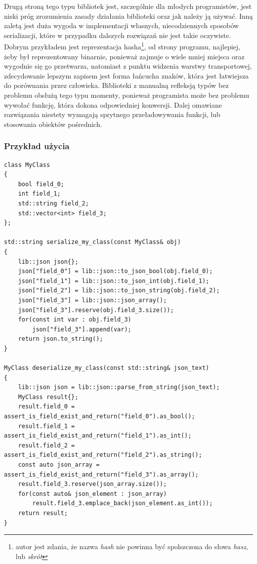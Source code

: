 \documentclass[12pt]{article}
\begin{document}
{{{				Drugą stroną tego typu bibliotek jest, szczególnie dla młodych programistów, jest niski próg zrozumienia zasady działania
				biblioteki oraz jak należy ją używać. Inną zaletą jest duża wygoda w implementacji własnych, niecodziennych sposobów serializacji,
				które w przypadku dalszych rozwiązań nie jest takie oczywiste. Dobrym przykładem jest reprezentacja hasha\footnote{
					autor jest zdania, że nazwa {\it hash} nie powinna być spolszczona do słowa {\it hasz}, lub {\it skrót}\cite{hash_po_angielskiemu}
				}, od strony programu, najlepiej, żeby był reprezentowany binarnie, ponieważ zajmuje o wiele mniej miejsca oraz wygodnie się go przetwarza,
				natomiast z punktu widzenia warstwy transportowej, zdecydowanie lepszym zapisem jest forma łańcucha znaków, która jest łatwiejsza do porównania
				przez człowieka. Biblioteki z manualną refleksją typów bez problemu obsłużą tego typu momenty, ponieważ programista może bez problemu
				wywołać funkcję, która dokona odpowiedniej konwersji. Dalej omawiane rozwiązania niestety wymagają sprytnego przeładowywania funkcji, lub
				stosowania obiektów pośrednich.
			}

			{
				\subsubsection{Przykład użycia}

				\begin{lstlisting}[frame=single]
class MyClass
{
	bool field_0;
	int field_1;
	std::string field_2;
	std::vector<int> field_3;
};

std::string serialize_my_class(const MyClass& obj)
{
	lib::json json{};
	json["field_0"] = lib::json::to_json_bool(obj.field_0);
	json["field_1"] = lib::json::to_json_int(obj.field_1);
	json["field_2"] = lib::json::to_json_string(obj.field_2);
	json["field_3"] = lib::json::json_array();
	json["field_3"].reserve(obj.field_3.size());
	for(const int var : obj.field_3)
		json["field_3"].append(var);
	return json.to_string();
}

MyClass deserialize_my_class(const std::string& json_text)
{
	lib::json json = lib::json::parse_from_string(json_text);
	MyClass result{};
	result.field_0 = assert_is_field_exist_and_return("field_0").as_bool();
	result.field_1 = assert_is_field_exist_and_return("field_1").as_int();
	result.field_2 = assert_is_field_exist_and_return("field_2").as_string();
	const auto json_array = assert_is_field_exist_and_return("field_3").as_array();
	result.field_3.reserve(json_array.size());
	for(const auto& json_element : json_array)
		result.field_3.emplace_back(json_element.as_int());
	return result;
}
				\end{lstlisting}
			}
		}

}
\end{document}
